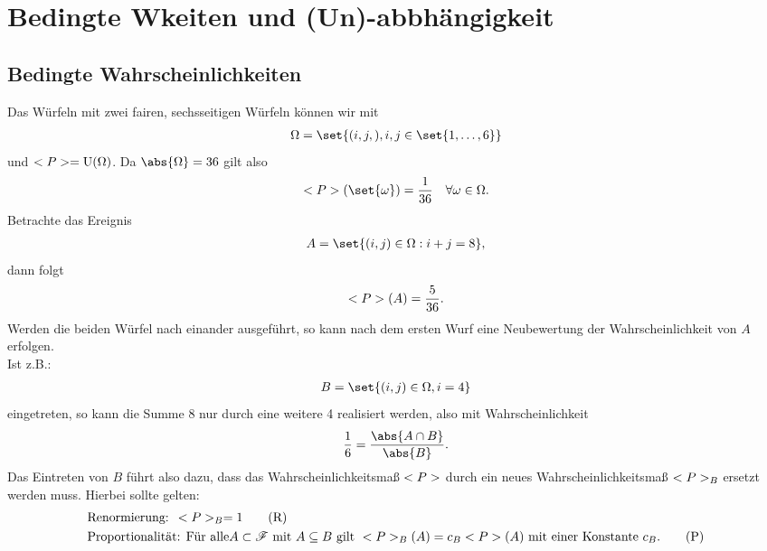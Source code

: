 \chapter[Bedingte Wahrscheinlichkeiten und (Un)-abbhängigkeit]{Bedingte Wkeiten und (Un)-abbhängigkeit}

\section{Bedingte Wahrscheinlichkeiten}
\begin{example}
	Das Würfeln mit zwei fairen, sechsseitigen Würfeln können wir mit 
	\begin{align}
		\Omega = \set{(i,j,), i,j \in \set{1,\dots,6}}\notag
	\end{align}
	und $<P> = \operatorname{U}(\Omega)$. Da $\abs{\Omega} = 36$ gilt also
	\begin{align}
		\probp(\set{\omega}) = \frac{1}{36} \quad \forall \omega \in \Omega.\notag
	\end{align}
	Betrachte das Ereignis
	\begin{align}
		A = \set{(i,j) \in \Omega : i + j = 8},\notag
	\end{align}
	dann folgt
	\begin{align}
		<P>(A) = \frac{5}{36}.\notag
	\end{align}
	Werden die beiden Würfel nach einander ausgeführt, so kann nach dem ersten Wurf eine Neubewertung der Wahrscheinlichkeit von $A$ erfolgen.\\
	Ist z.B.:
	\begin{align}
		B = \set{(i,j) \in \Omega, i = 4}\notag
	\end{align}
	eingetreten, so kann die Summe 8 nur durch eine weitere 4 realisiert werden, also mit Wahrscheinlichkeit
	\begin{align}
		\frac{1}{6} = \frac{\abs{A \cap B}}{\abs{B}}.\notag 
	\end{align}
	Das Eintreten von $B$ führt also dazu, dass das Wahrscheinlichkeitsmaß $<P>$ durch ein neues Wahrscheinlichkeitsmaß $<P>_{B}$ ersetzt werden muss. Hierbei sollte gelten:
	\begin{align}
		 &\text{Renormierung: }<P>_{B} = 1\label{Renorm}\tag{R}\\
		 &\text{Proportionalität: Für alle} A \subset \mathscr{F} \text{ mit } A \subseteq B \text{ gilt }
		 <P>_{B}(A) = c_B <P>(A) \text{ mit einer Konstante } c_B.\label{Prop}\tag{P}
    \end{align}
\end{example}

